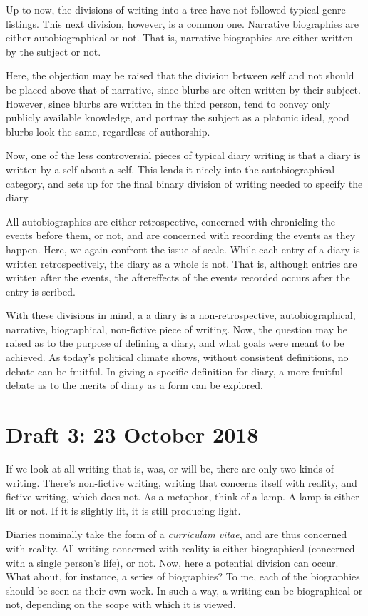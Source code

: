 \documentclass[12pt]{article}[titlepage]
\newcommand{\1}{\={a}}
\newcommand{\2}{\={e}}
\newcommand{\3}{\={\i}}
\newcommand{\4}{\=o}
\newcommand{\5}{\=u}
\newcommand{\6}{\={A}}
\renewcommand{\,}{\textsuperscript{,}}
\begin{document}
Up to now, the divisions of writing into a tree have not followed typical genre listings.
This next division, however, is a common one.
Narrative biographies are either autobiographical or not.
That is, narrative biographies are either written by the subject or not.

Here, the objection may be raised that the division between self and not should be placed above that of narrative, since blurbs are often written by their subject.
However, since blurbs are written in the third person, tend to convey only publicly available knowledge, and portray the subject as a platonic ideal, good blurbs look the same, regardless of authorship.

Now, one of the less controversial pieces of typical diary writing is that a diary is written by a self about a self.
This lends it nicely into the autobiographical category, and sets up for the final binary division of writing needed to specify the diary.

All autobiographies are either retrospective, concerned with chronicling the events before them, or not, and are concerned with recording the events as they happen.
Here, we again confront the issue of scale.
While each entry of a diary is written retrospectively, the diary as a whole is not.
That is, although entries are written after the events, the aftereffects of the events recorded occurs after the entry is scribed.

With these divisions in mind, a a diary is a non-retrospective, autobiographical, narrative, biographical, non-fictive piece of writing.
Now, the question may be raised as to the purpose of defining a diary, and what goals were meant to be achieved.
As today's political climate shows, without consistent definitions, no debate can be fruitful.
In giving a specific definition for diary, a more fruitful debate as to the merits of diary as a form can be explored.

\section{Draft 3: 23 October 2018}
If we look at all writing that is, was, or will be, there are only two kinds of writing.
There's non-fictive writing, writing that concerns itself with reality, and fictive writing, which does not.
As a metaphor, think of a lamp.
A lamp is either lit or not.
If it is slightly lit, it is still producing light.

Diaries nominally take the form of a \textit{curriculam vitae}, and are thus concerned with reality.
All writing concerned with reality is either biographical (concerned with a single person's life), or not.
Now, here a potential division can occur.
What about, for instance, a series of biographies?
To me, each of the biographies should be seen as their own work.
In such a way, a writing can be biographical or not, depending on the scope with which it is viewed.
\end{document}
